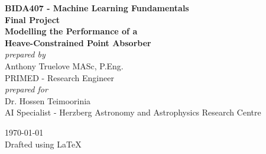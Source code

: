 \documentclass[12pt, letterpaper]{report}
\theoremstyle{definition}
\begin{document}

\begin{titlepage}
	\begin{center}
		\LARGE \textbf{BIDA407 - Machine Learning Fundamentals} \\
		\vspace{8mm}
        \LARGE \textbf{Final Project} \\
        \vspace{8mm}
        \Large \textbf{Modelling the Performance of a\\Heave-Constrained Point Absorber} \\
		\vfill
		\normalsize\textit{prepared by} \\
		\vspace{10mm}
		\large Anthony Truelove \footnotesize MASc, P.Eng. \\
        \vspace{4mm}
        \normalsize PRIMED - Research Engineer \\
        \vspace{30mm}
        \normalsize\textit{prepared for} \\
        \vspace{10mm}
        \large Dr. Hossen Teimoorinia \\
        \vspace{4mm}
        \normalsize AI Specialist - Herzberg Astronomy and Astrophysics Research Centre \\
	\end{center}
	\vfill
	\begin{center}
		\today \\
		\vspace{3mm}
		Drafted using \LaTeX
	\end{center}	   
\end{titlepage}







\newpage
{}
\tableofcontents

\newpage
{}
\listoftables

\newpage
{}
\listoffigures



\newpage
{}
\linenumbers








\newpage
{}
 
%
\end{document}
